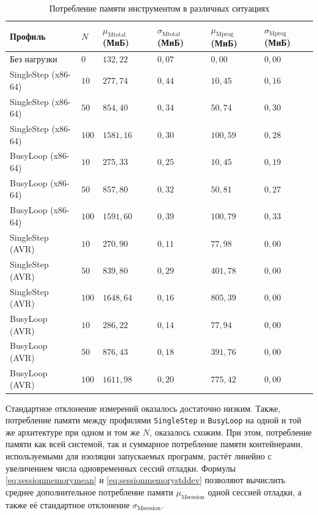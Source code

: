 \documentclass[a4paper,article,14pt]{extarticle}
\begin{document}
\begin{table}[ht]
\small
    \begin{tabular}{p{3.4cm}p{1cm}p{2.4cm}p{2.4cm}p{2.4cm}p{2.4cm}}
\toprule
    Профиль & $N$ & $\mu_\mathrm{Mtotal}$ (МиБ) & $\sigma_\mathrm{Mtotal}$ (МиБ) &
    $\mu_\mathrm{Mprog}$ (МиБ) & $\sigma_\mathrm{Mprog}$ (МиБ) \\
    \midrule
Без нагрузки & $0$ & $132{,}22$ & $0{,}07$ & $0{,}00$ & $0{,}00$ \\
SingleStep (x86-64) & $10$ & $277{,}74$ & $0{,}44$ & $10{,}45$ & $0{,}16$ \\
SingleStep (x86-64) & $50$ & $854{,}40$ & $0{,}34$ & $50{,}74$ & $0{,}30$ \\
SingleStep (x86-64) & $100$ & $1581{,}16$ & $0{,}30$ & $100{,}59$ & $0{,}28$ \\
BusyLoop (x86-64) & $10$ & $275{,}33$ & $0{,}25$ & $10{,}45$ & $0{,}19$ \\
BusyLoop (x86-64) & $50$ & $857{,}80$ & $0{,}32$ & $50{,}81$ & $0{,}27$ \\
BusyLoop (x86-64) & $100$ & $1591{,}60$ & $0{,}39$ & $100{,}79$ & $0{,}33$ \\
SingleStep (AVR) & $10$ & $270{,}90$ & $0{,}11$ & $77{,}98$ & $0{,}00$ \\
SingleStep (AVR) & $50$ & $839{,}80$ & $0{,}29$ & $401{,}78$ & $0{,}00$ \\
SingleStep (AVR) & $100$ & $1648{,}64$ & $0{,}16$ & $805{,}39$ & $0{,}00$ \\
BusyLoop (AVR) & $10$ & $286{,}22$ & $0{,}14$ & $77{,}94$ & $0{,}00$ \\
BusyLoop (AVR) & $50$ & $876{,}43$ & $0{,}18$ & $391{,}76$ & $0{,}00$ \\
BusyLoop (AVR) & $100$ & $1611{,}98$ & $0{,}20$ & $775{,}42$ & $0{,}00$ \\ \bottomrule
    \end{tabular}
\caption{\label{table:memorymeasurements}Потребление памяти инструментом в различных ситуациях}
\normalsize
\end{table}

Стандартное отклонение измерений оказалось достаточно низким. Также, потребление памяти между профилями \texttt{SingleStep} и \texttt{BusyLoop} на одной и той же архитектуре при одном и том же $N$, оказалось схожим. При этом, потребление памяти как всей системой, так и суммарное потребление памяти контейнерами, используемыми для изоляции запускаемых программ, растёт линейно с увеличением числа одновременных сессий отладки. Формулы \ref{eq:sessionmemorymean} и \ref{eq:sessionmemorystddev} позволяют вычислить среднее дополнительное потребление памяти $\mu_\mathrm{Msession}$ одной сессией отладки, а также её стандартное отклонение $\sigma_\mathrm{Msession}$.
\end{document}
